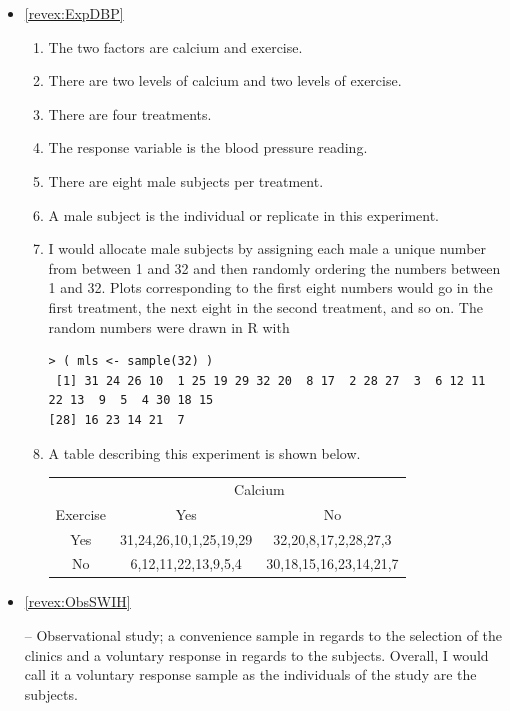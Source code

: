 \documentclass[10pt,openany]{book}\usepackage[]{graphicx}\usepackage[]{color}
\makeatletter
\newenvironment{kframe}{%
 \def\at@end@of@kframe{}%
 \ifinner\ifhmode%
  \def\at@end@of@kframe{\end{minipage}}%
  \begin{minipage}{\columnwidth}%
 \fi\fi%
 \def\FrameCommand##1{\hskip\@totalleftmargin \hskip-\fboxsep
 \colorbox{shadecolor}{##1}\hskip-\fboxsep
     \hskip-\linewidth \hskip-\@totalleftmargin \hskip\columnwidth}%
 \MakeFramed {\advance\hsize-\width
   \@totalleftmargin\z@ \linewidth\hsize
   \@setminipage}}%
 {\par\unskip\endMakeFramed%
 \at@end@of@kframe}
\newenvironment{knitrout}{}{} %
\makeatother
\begin{document}
\begin{itemize}
  \item \hypertarget{ans:ExpDBP}{\ref{revex:ExpDBP}}
    \begin{enumerate}
      \item The two factors are calcium and exercise.
      \item There are two levels of calcium and two levels of exercise.
      \item There are four treatments.
      \item The response variable is the blood pressure reading.
      \item There are eight male subjects per treatment.
      \item A male subject is the individual or replicate in this experiment.
      \item I would allocate male subjects by assigning each male a unique number from between 1 and 32 and then randomly ordering the numbers between 1 and 32.  Plots corresponding to the first eight numbers would go in the first treatment, the next eight in the second treatment, and so on.  The random numbers were drawn in R with
\begin{knitrout}
\color{fgcolor}\begin{kframe}
\begin{verbatim}
> ( mls <- sample(32) )
 [1] 31 24 26 10  1 25 19 29 32 20  8 17  2 28 27  3  6 12 11 22 13  9  5  4 30 18 15
[28] 16 23 14 21  7
\end{verbatim}
\end{kframe}
\end{knitrout}
      \item A table describing this experiment is shown below.

\begin{tabular}{cc|c|}
 & \multicolumn{2}{c}{Calcium} \\
\cline{2-3}
\multicolumn{1}{c|}{Exercise} & Yes & No \\
\hline
\multicolumn{1}{c|}{Yes} & 31,24,26,10,1,25,19,29 & \multicolumn{1}{c|}{32,20,8,17,2,28,27,3} \\
\hline
\multicolumn{1}{c|}{No} & 6,12,11,22,13,9,5,4 &  \multicolumn{1}{c|}{30,18,15,16,23,14,21,7} \\
\cline{2-3}
\end{tabular}
    \end{enumerate}

  \item \hypertarget{ans:ObsSWIH}{\ref{revex:ObsSWIH}} -- Observational study; a convenience sample in regards to the selection of the clinics and a voluntary response in regards to the subjects.  Overall, I would call it a voluntary response sample as the individuals of the study are the subjects.


\end{itemize}
\end{document}
